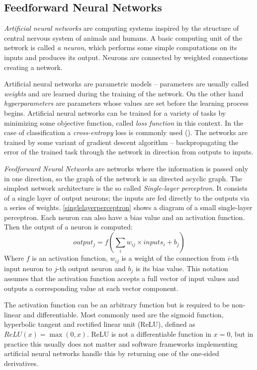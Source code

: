 \subsection{Feedforward Neural Networks}
\textit{Artificial neural networks} are computing systems inspired by the structure of central nervous system of animals and humans. A basic computing unit of the network is called \textit{a neuron}, which performs some simple computations on its inputs and produces its output. Neurons are connected by weighted connections creating a network. \par
Artificial neural networks are parametric models -- parameters are usually called \textit{weights} and are learned during the training of the network. On the other hand \textit{hyperparameters} are parameters whose values are set before the learning process begins. Artificial neural networks can be trained for a variety of tasks by minimizing some objective function, called \textit{loss function} in this context. In the case of classification a \textit{cross-entropy} loss is commonly used (\cite{goodfellow_deep_2016}). The networks are trained by some variant of gradient descent algorithm -- backpropagating the error of the trained task through the network in direction from outputs to inputs. \par
\textit{Feedforward Neural Networks} are networks where the information is passed only in one direction, so the graph of the network is an directed acyclic graph. The simplest network architecture is the so called \textit{Single-layer perceptron}. It consists of a single layer of output neurons; the inputs are fed directly to the outputs via a series of weights. \autoref{singlelayerperceptron} shows a diagram of a small single-layer perceptron. Each neuron can also have a bias value and an activation function. Then the output of a neuron is computed: $$output_j = f(\sum_{i} {w_{ij}\times inputs_i + b_j})$$ Where $f$ is an activation function, $w_{ij}$ is a weight of the connection from $i$-th input neuron to $j$-th output neuron and $b_j$ is its bias value. This notation assumes that the activation function accepts a full vector of input values and outputs a corresponding value at each vector component.

The activation function can be an arbitrary function but is required to be non-linear and differentiable. Most commonly used are the sigmoid function, hyperbolic tangent and rectified linear unit (ReLU), defined as $ReLU(x) = \max(0,x)$. ReLU is not a differentiable function in $x=0$, but in practice this usually does not matter and software frameworks implementing artificial neural networks handle this by returning one of the one-sided derivatives.\par  
